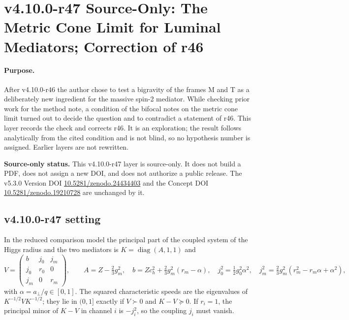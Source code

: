 \clearpage
\section*{v4.10.0-r47 Source-Only: The Metric Cone Limit for Luminal Mediators; Correction of r46}
\label{sec:v4100-r47-cone-limit}

\paragraph{Purpose.}
After v4.10.0-r46 the author chose to test a bigravity of the frames M and T as a deliberately new ingredient for the massive spin-2 mediator.
While checking prior work for the method note, a condition of the bifocal notes on the metric cone limit turned out to decide the question and
to contradict a statement of r46.  This layer records the check and corrects r46.  It is an exploration; the result follows analytically from the
cited condition and is not blind, so no hypothesis number is assigned.  Earlier layers are not rewritten.

\noindent\textbf{Source-only status.}
This v4.10.0-r47 layer is source-only.  It does not build a PDF, does not assign a new DOI,
and does not authorize a public release.  The v5.3.0 Version DOI
\href{https://doi.org/10.5281/zenodo.24434403}{10.5281/zenodo.24434403} and the Concept DOI
\href{https://doi.org/10.5281/zenodo.19210728}{10.5281/zenodo.19210728} are unchanged by it.

\subsection*{v4.10.0-r47 setting}
\label{subsec:v4100-r47-setting}

In the reduced comparison model the principal part of the coupled system of the Higgs radius and the two mediators is \(K=\operatorname{diag}(A,1,1)\) and
\[
 V=\begin{pmatrix} b & j_0 & j_m\\ j_0 & r_0 & 0\\ j_m & 0 & r_m\end{pmatrix},\qquad
 A=Z-\tfrac23g_m^2,\quad b=Zc_h^2+\tfrac23g_m^2(r_m-\alpha),\quad j_0^2=\tfrac12g_0^2\alpha^2,\quad j_m^2=\tfrac23g_m^2(r_m^2-r_m\alpha+\alpha^2),
\]
with \(\alpha=a_\perp/q\in[0,1]\).  The squared characteristic speeds are the eigenvalues of \(K^{-1/2}VK^{-1/2}\); they lie in \((0,1]\) exactly if \(V\succ0\) and \(K-V\succeq0\).  If
\(r_i=1\), the principal minor of \(K-V\) in channel \(i\) is \(-j_i^2\), so the coupling \(j_i\) must vanish.

